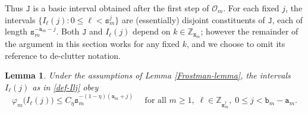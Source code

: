 \documentclass[12pt, twoside]{article}
\newtheorem{lemma}[theorem]{Lemma}
\theoremstyle{definition}
\numberwithin{equation}{section}
\begin{document}
Thus $\mathtt J$ is a basic interval obtained after the first step of $\mathscr{O}_m$. For each fixed $j$, the intervals $\{{I}_{\ell}(j) : 0 \leq \ell < \mathtt s_m^j \}$ are (essentially) disjoint constituents of $\mathtt J$, each of length $\mathtt s_m^{-\mathtt a_m - j}$. Both $\mathtt J$ and $I_{\ell}(j)$ depend on $k \in \mathbb Z_{\mathtt N_m}$; however the remainder of the argument in this section works for any fixed $k$, and we choose to omit its reference to de-clutter notation.
\begin{lemma} 
	Under the assumptions of Lemma \ref{Frostman-lemma}, the intervals ${I}_{\ell}(j)$ as in \eqref{def-Ilj} obey 
	\begin{equation} \label{Frostman-nonspecial-scales}
		\varphi_{m} \bigl({I}_{\ell}(j)\bigr) \leq C_{\eta} \mathtt s_m^{-(1 - \eta)(\mathtt a_m + j)} \quad \text{ for all } m \geq 1, \; \ell \in \mathbb Z_{\mathtt s_m^j}, \; 0 \leq j < \mathtt b_m-\mathtt a_m.  
	\end{equation} 
\end{lemma} 
\end{document}
